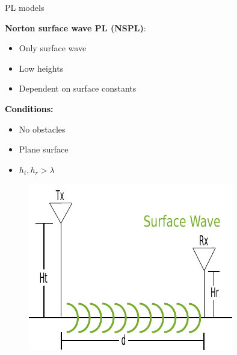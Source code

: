 \documentclass[10pt]{beamer}
\begin{document}
\begin{frame}{PL models}
\begin{minipage}{.45\textwidth}
\raggedright\textcolor{thomasgreen}{\textbf{Norton surface wave PL (NSPL)}:}
\begin{itemize}
\item Only surface wave
\item Low heights
\item Dependent on surface constants
\end{itemize}

\vspace{1em}
\textcolor{black}{\textbf{Conditions:}}
\begin{itemize}
\item No obstacles
\item Plane surface
\item $h_t,h_r > \lambda$
\end{itemize}

\end{minipage}%
\begin{minipage}{0.5\textwidth}
\begin{figure}[!htbp]
 \centering
  \includegraphics[width = \columnwidth]{figures/surf_illu.pdf}
  \end{figure}
\end{minipage}
\end{frame}
\end{document}
